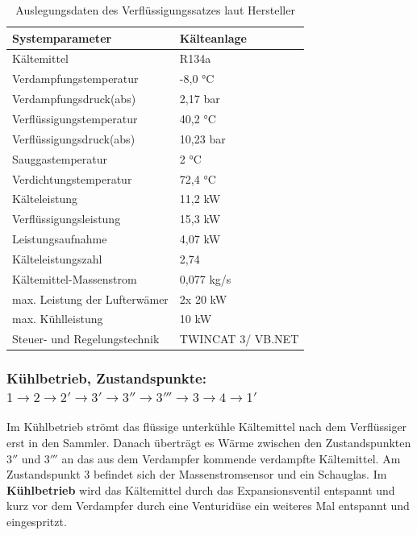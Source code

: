 \begin{table}[htb]
\centering
\caption{Auslegungsdaten des Verflüssigungssatzes laut Hersteller}\vspace{6pt}
\label{tab:Parameter KK}
\begin{tabular}{ll}
\hline 
\textbf{Systemparameter} & \textbf{Kälteanlage} \\ 
\hline 
\hline
Kältemittel & R134a\\
\hline
Verdampfungstemperatur & -8,0 °C\\
\hline
Verdampfungsdruck(abs) & 2,17 bar\\
\hline
Verflüssigungstemperatur & 40,2 °C\\
\hline
Verflüssigungsdruck(abs) & 10,23 bar\\
\hline
Sauggastemperatur & 2 °C\\
\hline
Verdichtungstemperatur &72,4 °C\\
\hline
Kälteleistung & 11,2 kW \\ 
\hline 
Verflüssigungsleistung & 15,3 kW\\
\hline
Leistungsaufnahme & 4,07 kW \\ 
\hline
Kälteleistungszahl & 2,74\\
\hline 
Kältemittel-Massenstrom & 0,077 kg/s \\ 
\hline 
max. Leistung der Lufterwämer & 2x 20 kW \\ 
\hline 
max. Kühlleistung & 10 kW \\ 
\hline 
Steuer- und Regelungstechnik & TWINCAT 3/ VB.NET \\ 
\hline 
\hline 
\end{tabular} 
\end{table}


\subsubsection{Kühlbetrieb, Zustandspunkte: $1 \rightarrow 2 \rightarrow 2'\rightarrow 3' \rightarrow 3''\rightarrow  3''' \rightarrow 3 \rightarrow 4 \rightarrow 1' $}

Im Kühlbetrieb strömt das flüssige unterkühle Kältemittel nach dem Verflüssiger erst in den Sammler. Danach überträgt es Wärme zwischen den Zustandspunkten $3''$ und $3'''$ an das aus dem Verdampfer kommende verdampfte Kältemittel. Am Zustandspunkt $3$ befindet sich der Massenstromsensor und ein Schauglas.  
Im \textbf{Kühlbetrieb} wird das Kältemittel durch das Expansionsventil entspannt und kurz vor dem Verdampfer durch eine Venturidüse ein weiteres Mal entspannt und eingespritzt.

